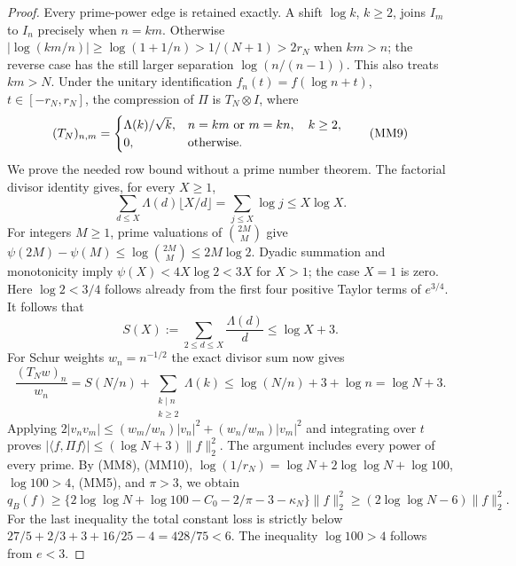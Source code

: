 \documentclass[11pt]{article}
\theoremstyle{remark}\newtheorem{remark}[theorem]{Remark}
\begin{document}
\begin{proof}
Every prime-power edge is retained exactly. A shift $\log k$,
$k\ge2$, joins $I_m$ to $I_n$ precisely when $n=km$.
Otherwise
$|\log(km/n)|\ge\log(1+1/n)>1/(N+1)>2r_N$ when $km>n$;
the reverse case has the still larger separation
$\log(n/(n-1))$. This also treats $km>N$.
Under the unitary identification $f_n(t)=f(\log n+t)$,
$t\in[-r_N,r_N]$, the compression of $\Pi$ is $T_N\otimes I$,
where
\[
 (T_N)_{n,m}=
 \begin{cases}
   \Lambda(k)/\sqrt k,& n=km\ \hbox{or }m=kn,\quad k\ge2,\\
   0,&\hbox{otherwise}.
 \end{cases} \tag{MM9}
\]
We prove the needed row bound without a prime number theorem.
The factorial divisor identity gives, for every $X\ge1$,
\[
 \sum_{d\le X}\Lambda(d)\lfloor X/d\rfloor
   =\sum_{j\le X}\log j\le X\log X.
\]
For integers $M\ge1$, prime valuations of $\binom{2M}{M}$ give
$\psi(2M)-\psi(M)\le\log\binom{2M}{M}\le2M\log2$.
Dyadic summation and monotonicity imply
$\psi(X)<4X\log2<3X$ for $X>1$; the case $X=1$ is zero.
Here $\log2<3/4$ follows already from the first four positive
Taylor terms of $e^{3/4}$. It follows that
\[
 S(X):=\sum_{2\le d\le X}\frac{\Lambda(d)}d\le\log X+3.
\]
For Schur weights $w_n=n^{-1/2}$ the exact divisor sum now gives
\[
 \frac{(T_Nw)_n}{w_n}
   =S(N/n)+\sum_{\substack{k\mid n\\ k\ge2}}\Lambda(k)
   \le\log(N/n)+3+\log n=\log N+3. \tag{MM10}
\]
Applying $2|v_nv_m|\le(w_m/w_n)|v_n|^2+
(w_n/w_m)|v_m|^2$ and integrating over $t$ proves
$|\langle f,\Pi f\rangle|\le(\log N+3)\|f\|_2^2$.
The argument includes every power of every prime.
By (MM8), (MM10), $\log(1/r_N)=\log N+2\log\log N+\log100$,
$\log100>4$, (MM5), and $\pi>3$, we obtain
\[
 q_B(f)\ge
 \{2\log\log N+\log100-C_0-2/\pi-3-\kappa_N\}\|f\|_2^2
 \ge(2\log\log N-6)\|f\|_2^2. \tag{MM11}
\]
For the last inequality the total constant loss is strictly below
$27/5+2/3+3+16/25-4=428/75<6$.
The inequality $\log100>4$ follows from $e<3$.


\end{proof}
\end{document}
